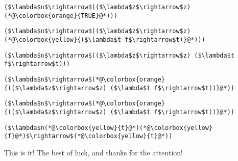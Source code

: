 \documentclass{beamer}
\begin{document}
\begin{frame}[fragile]{\CurrentSection}
\lstset{basicstyle=\ttfamily\small}\lstset{numbers=none}\lstset{language=ML}\begin{lstlisting}
($\lambda$n$\rightarrow$(($\lambda$z$\rightarrow$z) (*@\colorbox{orange}{TRUE}@*)))
\end{lstlisting}
\pause\lstset{language=ML}\begin{lstlisting}
($\lambda$n$\rightarrow$(($\lambda$z$\rightarrow$z) (*@\colorbox{yellow}{($\lambda$t f$\rightarrow$t)}@*)))
\end{lstlisting}

\end{frame}

\begin{frame}[fragile]{\CurrentSection}
\lstset{basicstyle=\ttfamily\small}\lstset{numbers=none}\lstset{language=ML}\begin{lstlisting}
($\lambda$n$\rightarrow$(($\lambda$z$\rightarrow$z) ($\lambda$t f$\rightarrow$t)))
\end{lstlisting}
\pause\lstset{language=ML}\begin{lstlisting}
($\lambda$n$\rightarrow$(*@\colorbox{orange}{(($\lambda$z$\rightarrow$z) ($\lambda$t f$\rightarrow$t))}@*))
\end{lstlisting}

\end{frame}

\begin{frame}[fragile]{\CurrentSection}
\lstset{basicstyle=\ttfamily\small}\lstset{numbers=none}\lstset{language=ML}\begin{lstlisting}
($\lambda$n$\rightarrow$(*@\colorbox{orange}{(($\lambda$z$\rightarrow$z) ($\lambda$t f$\rightarrow$t))}@*))
\end{lstlisting}
\pause\lstset{language=ML}\begin{lstlisting}
($\lambda$n(*@\colorbox{yellow}{t}@*)(*@\colorbox{yellow}{f}@*)$\rightarrow$(*@\colorbox{yellow}{t}@*))
\end{lstlisting}

\end{frame}


\begin{frame}{This is it!}
\center
\fontsize{18pt}{7.2}\selectfont
The best of luck, and thanks for the attention!
\end{frame}
\end{document}
